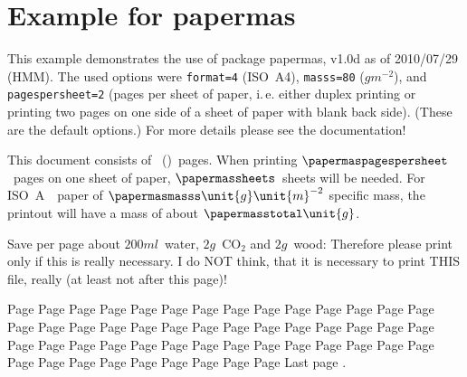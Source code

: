 \documentclass[british,a4paper]{article}
\begin{document}

\section*{Example for papermas}

This example demonstrates the use of package\newline
\textsf{papermas}, v1.0d as of 2010/07/29 (HMM).\newline
The used options were \texttt{format=4} (ISO~A4),
\texttt{masss=80} ($\unit{g}\unit{m}^{-2}$), and\newline
\texttt{pagespersheet=2} (pages per sheet of paper,
i.\,e. either duplex printing or\newline
printing two pages on one side of a sheet of paper with blank back side).\newline
(These are the default options.)\newline
For more details please see the documentation!\newline

\bigskip

This document consists of
~()~pages.
When printing $\papermaspagespersheet$~pages on one sheet of
paper, $\papermassheets$~sheets will be needed. For
ISO~A~\papermasformat\ paper of $\papermasmasss \unit{g}\unit{m}^{-2}$
specific mass, the printout will have a mass of about
$\papermasstotal \unit{g}$.

\bigskip

Save per page about $200\unit{ml}$~water, $2\unit{g}$~CO$_{2}$
and $2\unit{g}$~wood:\newline
Therefore please print only if this is really necessary.\newline
I do NOT think, that it is necessary to print THIS file, really\newline
(at least not after this page)!


\newpage Page \thepage
\newpage Page \thepage
\newpage Page \thepage
\newpage Page \thepage
\newpage Page \thepage
\newpage Page \thepage
\newpage Page \thepage
\newpage Page \thepage
\newpage Page \thepage
\newpage Page \thepage
\newpage Page \thepage
\newpage Page \thepage
\newpage Page \thepage
\newpage Page \thepage
\newpage Page \thepage
\newpage Page \thepage
\newpage Page \thepage
\newpage Page \thepage
\newpage Page \thepage
\newpage Page \thepage
\newpage Page \thepage
\newpage Page \thepage
\newpage Page \thepage
\newpage Page \thepage
\newpage Page \thepage
\newpage Page \thepage
\newpage Page \thepage
\newpage Page \thepage
\newpage Page \thepage
\newpage Page \thepage
\newpage Page \thepage
\newpage Page \thepage
\newpage Page \thepage
\newpage Page \thepage
\newpage Page \thepage
\newpage Page \thepage
\newpage Page \thepage
\newpage Page \thepage
\newpage Page \thepage
\newpage Page \thepage
\newpage Page \thepage
\newpage Page \thepage
\newpage Page \thepage
\newpage Page \thepage
\newpage Page \thepage
\newpage Page \thepage
\newpage Page \thepage
\newpage Page \thepage
\newpage Page \thepage
\newpage Page \thepage
\newpage Page \thepage
\newpage Last page \thepage.
\end{document}
